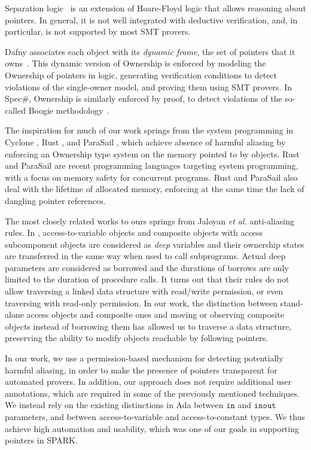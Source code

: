 \documentclass{llncs}
\newcommand\var[1]{\ensuremath{\mathtt{#1}}}
\begin{document}
Separation logic~\cite{Reynolds02} is an extension of Hoare-Floyd logic that allows reasoning about pointers. In general, it is not well integrated with deductive
verification, and, in particular, is not supported by most SMT provers.


Dafny associates each object with its \emph{dynamic frame}, the set of pointers that it owns~\cite{Leino10}. This dynamic version of Ownership is
enforced by modeling the Ownership of pointers in logic, generating verification conditions to detect violations of the single-owner model, and proving
them using SMT provers. In Spec\#, Ownership is similarly enforced by proof, to detect violations of the so-called Boogie methodology~\cite{Boogie}.

The inspiration for much of our work springs from the system programming in Cyclone \cite{Grossman2002}, Rust \cite{Balasubramanian17}, and ParaSail \cite{Taft11}, which achieve absence of
harmful aliasing by enforcing an Ownership type system on the memory pointed to by objects. Rust and ParaSail are recent programming languages targeting system
programming, with a focus on memory safety for concurrent programs.
Rust and ParaSail also deal with the lifetime of allocated memory, enforcing
at the same time the lack of dangling pointer references.

The most closely related works to ours springs from Jaloyan \textit{et al.} \cite{Jaloyan18} anti-aliasing rules. In \cite{Jaloyan18}, access-to-variable objects
and composite objects with access subcomponent objects are considered as \textit{deep} variables and their ownership states are transferred in the same way when used to call subprograms.
Actual deep parameters are considered as borrowed and the durations of borrows are only limited to the duration of procedure calls.   
It turns out that their rules do not allow traversing a linked data structure with read/write permission, or even traversing with read-only permission. In our work, the distinction between stand-alone access
objects and composite ones and moving or observing composite objects instead of borrowing them has allowed us to traverse a data structure, preserving the ability to modify objects reachable by following pointers. 

In our work, we use a permission-based mechanism for detecting potentially harmful aliasing, in order to make the presence of pointers transparent for automated provers.
In addition, our approach does not require additional user annotations, which are required in some of the previously mentioned techniques.  We instead rely on the existing distinctions in Ada between \var{in} and \var{in out} parameters, and between access-to-variable and access-to-constant types. We thus achieve high automation
and usability, which was one of our goals in supporting pointers in SPARK.
\end{document}
